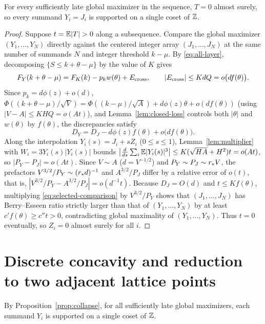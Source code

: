 \begin{proposition}\label{prop:collapse}
For every sufficiently late global maximizer in the sequence, $T=0$ almost
surely, so every summand $Y_i=J_i$ is supported on a single coset of $\mathbb Z$.
\end{proposition}
\begin{proof}
Suppose $t=\E|T|>0$ along a subsequence. Compare the global maximizer
$(Y_1,\ldots,Y_N)$ directly against the centered integer array
$(J_1,\ldots,J_N)$ at the same number of summands $N$ and integer threshold
$k-\mu$. By \eqref{eq:all-layer}, decomposing $\{S\le k+\theta-\mu\}$ by the
value of $K$ gives
\begin{equation}\label{eq:exact-crossing}
 F_Y(k+\theta-\mu)=F_K(k)-p_kw(\theta)+E_{\rm cross},\qquad
                         |E_{\rm cross}|\le KdQ=o\bigl(df(\theta)\bigr).
\end{equation}
Since $p_k=d\phi(z)+o(d)$, $\Phi((k+\theta-\mu)/\sqrt V)=\Phi((k-\mu)/\sqrt A)+d\phi(z)\theta+o(df(\theta))$
(using $|V-A|\le KHQ=o(At)$), and Lemma~\ref{lem:closed-loss} controls both
$|\theta|$ and $w(\theta)$ by $f(\theta)$, the discrepancies satisfy
\begin{equation}\label{eq:selected-comparison}
          D_Y=D_J-d\phi(z)f(\theta)+o\bigl(df(\theta)\bigr).
\end{equation}
Along the interpolation $Y_i(s)=J_i+sZ_i$ ($0\le s\le1$),
Lemma~\ref{lem:multiplier} with $W_i=3Y_i(s)|Y_i(s)|$ bounds
$\bigl|\frac{d}{ds}\sum_i\mathbb E|Y_i(s)|^3\bigr|\le K(\sqrt{HA}+H^2)t=o(At)$, so
$|P_Y-P_J|=o(At)$. Since $V\sim A$ ($d=V^{-1/2}$) and $P_Y\sim P_J\sim r_* V$,
the prefactors $V^{3/2}/P_Y\sim(r_* d)^{-1}$ and $A^{3/2}/P_J$ differ by a
relative error of $o(t)$, that is, $|V^{3/2}/P_Y-A^{3/2}/P_J|=o(d^{-1}t)$.
Because $D_J=O(d)$ and $t\le Kf(\theta)$, multiplying
\eqref{eq:selected-comparison} by $V^{3/2}/P_Y$ shows that
$(J_1,\ldots,J_N)$ has Berry--Esseen ratio strictly larger than that of
$(Y_1,\ldots,Y_N)$ by at least $c'f(\theta)\ge c''t>0$, contradicting global
maximality of $(Y_1,\ldots,Y_N)$. Thus $t=0$ eventually, so $Z_i=0$ almost
surely for all $i$.
\end{proof}

\section{Discrete concavity and reduction to two adjacent lattice points}\label{sec:lattice}

By Proposition~\ref{prop:collapse}, for all sufficiently late global
maximizers, each summand $Y_i$ is supported on a single coset of $\mathbb Z$.

